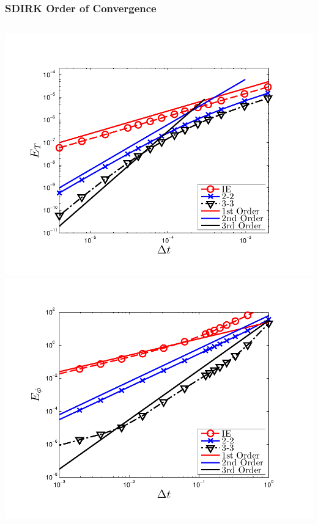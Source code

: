 \documentclass{beamer}
\begin{document}
\begin{frame}
\frametitle{SDIRK Order of Convergence}
\begin{columns}[t]
\centering
\includegraphics[width=\textwidth,trim=0.25in  0.2in 0.75in 0.5in,clip=true]{../chapter6_grey_radtran/Dissertation_Data/Time_Integrators_Convergence_Temperature.pdf}
\centering
\includegraphics[width=\textwidth,trim=0.25in  0.2in 0.75in 0.5in,clip=true]{../chapter6_grey_radtran/Dissertation_Data/Time_Integrators_Convergence_Phi.pdf}
\end{columns}
\end{frame}
\end{document}
